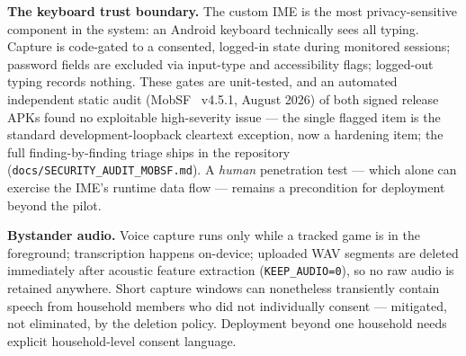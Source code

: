 \documentclass[11pt,a4paper]{article}
\begin{document}
\textbf{The keyboard trust boundary.} The custom IME is the most
privacy-sensitive component in the system: an Android keyboard technically
sees all typing. Capture is code-gated to a consented, logged-in state during
monitored sessions; password fields are excluded via input-type and
accessibility flags; logged-out typing records nothing. These gates are
unit-tested, and an automated independent static audit (MobSF~\cite{mobsf} v4.5.1, August
2026) of both signed release APKs found no exploitable high-severity issue ---
the single flagged item is the standard development-loopback cleartext
exception, now a hardening item; the full finding-by-finding triage ships in
the repository (\texttt{docs/SECURITY\_AUDIT\_MOBSF.md}). A \emph{human}
penetration test --- which alone can exercise the IME's runtime data flow ---
remains a precondition for deployment beyond the pilot.

\textbf{Bystander audio.} Voice capture runs only while a tracked game is in
the foreground; transcription happens on-device; uploaded WAV segments are
deleted immediately after acoustic feature extraction
(\texttt{KEEP\_AUDIO=0}), so no raw audio is retained anywhere. Short capture
windows can nonetheless transiently contain speech from household members who
did not individually consent --- mitigated, not eliminated, by the deletion
policy. Deployment beyond one household needs explicit household-level consent
language.
\end{document}
